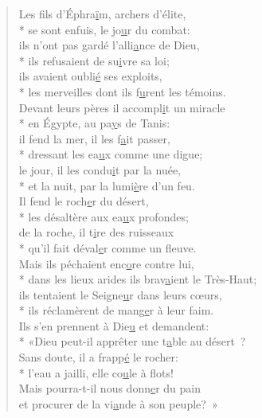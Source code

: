 \begin{verse}
Les fils d’Éphra\underline{ï}m, archers d’élite, \\*
se sont enfuis, le jo\underline{u}r du combat: \\
ils n’ont pas gardé l’alli\underline{a}nce de Dieu, \\*
ils refusaient de su\underline{i}vre sa loi; \\
ils avaient oubli\underline{é} ses exploits, \\*
les merveilles dont ils f\underline{u}rent les témoins. \\

Devant leurs pères il accompl\underline{i}t un miracle \\*
en Égypte, au pa\underline{y}s de Tanis: \\
il fend la mer, il les f\underline{a}it passer, \\*
dressant les ea\underline{u}x comme une digue; \\
le jour, il les condu\underline{i}t par la nuée, \\*
et la nuit, par la lumi\underline{è}re d’un feu. \\

Il fend le roch\underline{e}r du désert, \\*
les désaltère aux ea\underline{u}x profondes; \\
de la roche, il t\underline{i}re des ruisseaux \\*
qu’il fait déval\underline{e}r comme un fleuve. \\

Mais ils péchaient enc\underline{o}re contre lui, \\*
dans les lieux arides ils brav\underline{a}ient le Très-Haut; \\
ils tentaient le Seigne\underline{u}r dans leurs cœurs, \\*
ils réclamèrent de mang\underline{e}r à leur faim. \\

Ils s’en prennent à Die\underline{u} et demandent: \\*
«Dieu peut-il apprêter une t\underline{a}ble au désert ? \\
Sans doute, il a frapp\underline{é} le rocher: \\*
l’eau a jailli, elle co\underline{u}le à flots! \\
Mais pourra-t-il nous donn\underline{e}r du pain \\
et procurer de la vi\underline{a}nde à son peuple? » \\


\end{verse}
